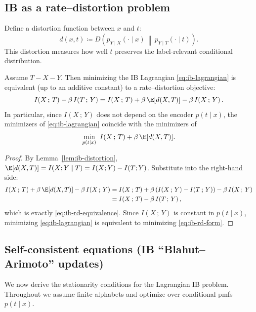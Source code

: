 \documentclass{article}
\numberwithin{equation}{section}
\newcommand{\KL}[2]{D\!\left(#1\,\middle\|\,#2\right)}
\newcommand{\MI}[2]{I\!\left(#1\,;\,#2\right)}
\begin{document}
\subsection{IB as a rate--distortion problem}

Define a distortion function between $x$ and $t$:
\begin{equation}
\label{eq:ib-distortion-def}
    d(x,t) \coloneqq \KL{p_{Y\mid X}(\cdot\mid x)}{p_{Y\mid T}(\cdot\mid t)}.
\end{equation}
This distortion measures how well $t$ preserves the label-relevant conditional distribution.

\begin{theorem}
\label{thm:ib-rd}
Assume $T-X-Y$.
Then minimizing the IB Lagrangian \eqref{eq:ib-lagrangian} is equivalent (up to an additive constant) to a rate--distortion objective:
\begin{equation}
\label{eq:ib-rd-equivalence}
    \MI{X}{T} - \beta\,\MI{T}{Y}
    = \MI{X}{T} + \beta\,\E[d(X,T)] - \beta\,\MI{X}{Y}.
\end{equation}
In particular, since $\MI{X}{Y}$ does not depend on the encoder $p(t\mid x)$, the minimizers of \eqref{eq:ib-lagrangian} coincide with the minimizers of
\begin{equation}
\label{eq:ib-rd-form}
    \min_{p(t\mid x)}\ \MI{X}{T} + \beta\,\E[d(X,T)].
\end{equation}
\end{theorem}
\begin{proof}
By Lemma~\ref{lem:ib-distortion}, $\E[d(X,T)] = I(X;Y\mid T) = I(X;Y)-I(T;Y)$.
Substitute into the right-hand side:
\begin{align}
\MI{X}{T} + \beta\,\E[d(X,T)] - \beta\,\MI{X}{Y}
&= \MI{X}{T} + \beta\,(\MI{X}{Y}-\MI{T}{Y}) - \beta\,\MI{X}{Y}\\
&= \MI{X}{T} - \beta\,\MI{T}{Y},
\end{align}
which is exactly \eqref{eq:ib-rd-equivalence}.
Since $\MI{X}{Y}$ is constant in $p(t\mid x)$, minimizing \eqref{eq:ib-lagrangian} is equivalent to minimizing \eqref{eq:ib-rd-form}.
\end{proof}

\subsection{Self-consistent equations (IB ``Blahut--Arimoto'' updates)}

We now derive the stationarity conditions for the Lagrangian IB problem.
Throughout we assume finite alphabets and optimize over conditional pmfs $p(t\mid x)$.
\end{document}
